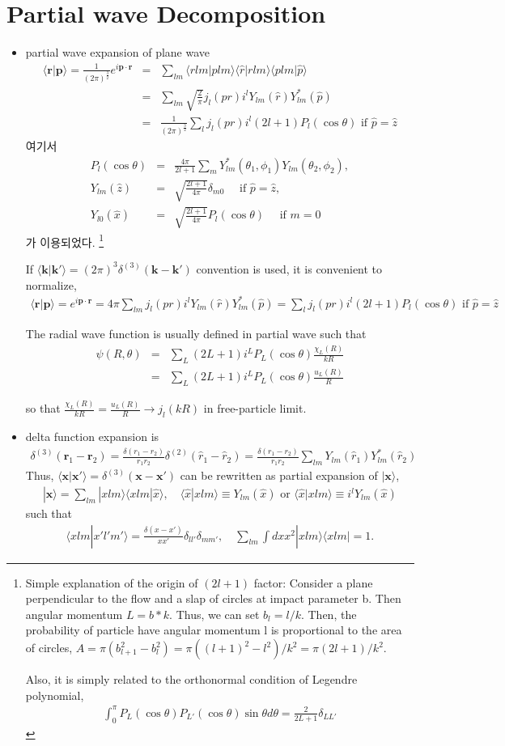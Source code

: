 \documentclass[10pt]{article}
\def\bm{\boldsymbol}
\newcommand{\bea}{\begin{eqnarray}}
\newcommand{\eea}{\end{eqnarray}}
\newcommand{\no}{\nonumber \\}
\def\vp{{\bm p}}
\def\vk{{\bm k}}
\def\vx{{\bm x}}
\def\vr{{\bm r}}
\def\la{\langle}
\def\ra{\rangle}
\begin{document}
\section{Partial wave Decomposition}
\begin{itemize}
\item partial wave expansion of plane wave
\bea
\la \vr|\vp\ra=\frac{1}{(2\pi)^{\frac{3}{2}}}e^{i\vp\cdot\vr}
&=& \sum_{lm} \la r lm| p lm\ra \la \hat{r}|r lm\ra 
                                \la p lm |\hat{p}\ra    
\no
&=& \sum_{lm} \sqrt{\frac{2}{\pi}} j_l(pr) i^l Y_{lm}(\hat{r})Y^*_{lm}(\hat{p}) \no
&=& \frac{1}{(2\pi)^{\frac{3}{2}}}
\sum_{l}j_l(pr) i^l(2l+1) P_{l}(\cos\theta) 
\mbox{ if $\hat{p}=\hat{z}$}
\eea
여기서 
\bea
P_l(\cos\theta)&=&
\frac{4\pi}{2l+1}\sum_{m} Y_{lm}^*(\theta_1,\phi_1 )
                   Y_{lm}(\theta_2,\phi_2),\no   
Y_{lm}(\hat{z})&=&\sqrt{\frac{2l+1}{4\pi}}\delta_{m0}
\quad \mbox{ if $\hat{p}=\hat{z}$},\no 
Y_{l0}(\hat{x})&=&\sqrt{\frac{2l+1}{4\pi}} P_l(\cos\theta)
\quad \mbox{ if $m=0$}
\eea
가 이용되었다.
\footnote{Simple explanation of the origin of $(2l+1)$ factor:
Consider a plane perpendicular to the flow and a slap of circles
at impact parameter b. Then angular momentum $L=b*k$. Thus, we can
set $b_l=l/k$. 
Then, the probability of particle have angular momentum l
is proportional to the area of circles,
$A=\pi(b_{l+1}^2-b_l^2)=\pi((l+1)^2-l^2)/k^2 =\pi(2l+1)/k^2 $. 

Also, it is simply related to the orthonormal condition of Legendre polynomial,
\bea 
\int_{0}^\pi P_L(\cos\theta)P_{L'}(\cos\theta) \sin\theta d\theta= \frac{2}{2L+1}\delta_{LL'}
\eea 
}

If $\la \vk|\vk'\ra=(2\pi)^3\delta^{(3)}(\vk-\vk')$
convention is used, it is convenient to normalize,
\bea
\boxed{\la \vr|\vp\ra=e^{i\vp\cdot\vr}
=4\pi \sum_{lm} j_l(pr) i^l Y_{lm}(\hat{r})Y^*_{lm}(\hat{p})
=\sum_l j_l(pr)i^l (2l+1) P_l(\cos\theta)
\mbox{ if } \hat{p}=\hat{z} }
\eea

The radial wave function is usually defined in partial wave such that
\bea 
\psi(R,\theta)&=&\sum_{L} (2L+1) i ^L P_L(\cos\theta) \frac{\chi_L(R)}{kR} \no 
              &=&\sum_{L} (2L+1) i ^L P_L(\cos\theta) \frac{u_L(R)}{R} 
\eea 

so that $\frac{\chi_L(R)}{kR}=\frac{u_L(R)}{R}\to j_l(kR)$ in free-particle limit. 

\item delta function expansion is
\bea
\boxed{
\delta^{(3)}(\vr_1-\vr_2)=
 \frac{\delta(r_1-r_2)}{r_1 r_2}\delta^{(2)}(\hat{r}_1-\hat{r}_2)
 = 
 \frac{\delta(r_1-r_2)}{r_1 r_2}
 \sum_{lm} Y_{lm}(\hat{r}_1)Y^*_{lm}(\hat{r}_2) }
\eea
Thus, $\la \vx|\vx'\ra=\delta^{(3)}(\vx-\vx')$ can be rewritten as
partial expansion of $|\vx\ra$,
\bea
|\vx\ra=\sum_{lm}|x lm\ra\la x lm|\hat{x}\ra,\quad
      \la\hat{x}| x lm\ra\equiv Y_{lm}(\hat{x}) \mbox{ or }
      \la\hat{x}| x lm\ra\equiv i^l Y_{lm}(\hat{x})
\eea
such that 
\bea
\la x lm|x' l' m'\ra=\frac{\delta(x-x')}{xx'}\delta_{ll'}\delta_{mm'},
\quad
\sum_{lm}\int dx x^2 |x lm\ra\la x lm|=1.
\eea


\end{itemize}
\end{document}
